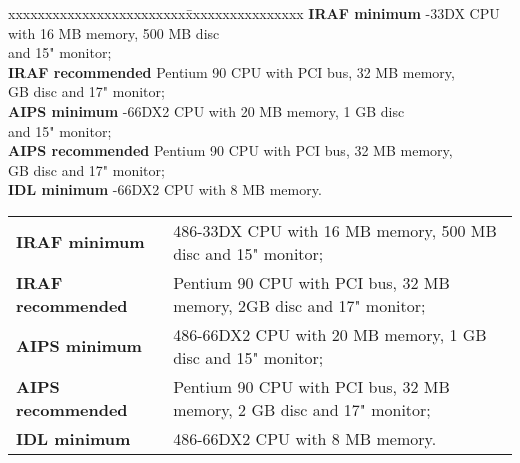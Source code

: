 \documentclass[twoside,11pt]{article}
\newenvironment{latexonly}{}{}
\begin{document}
\begin{latexonly}
\begin{tabbing}
xxxxxxxxxxxxxxxxxxxxxxxx\=xxxxxxxxxxxxxxxx\kill
{\bf IRAF minimum}     -33DX CPU with 16 MB memory, 500 MB disc\\
                       \> and 15" monitor;\\
{\bf IRAF recommended} \> Pentium 90 CPU with PCI bus, 32 MB memory,\\
                        GB disc and 17" monitor;\\
{\bf AIPS minimum}     -66DX2 CPU with 20 MB memory, 1 GB disc\\
                       \> and 15" monitor;\\
{\bf AIPS recommended} \> Pentium 90 CPU with PCI bus, 32 MB memory,\\
                        GB disc and 17" monitor;\\
{\bf IDL minimum}      -66DX2 CPU with 8 MB memory.
\end{tabbing}
\end{latexonly}

\begin{htmlonly}
\begin{tabular}{ll}
{\bf IRAF minimum}     & 486-33DX CPU with 16 MB memory, 500 MB disc and 15" monitor;\\
{\bf IRAF recommended} & Pentium 90 CPU with PCI bus, 32 MB memory, 2GB disc and 17" monitor;\\
{\bf AIPS minimum}     & 486-66DX2 CPU with 20 MB memory, 1 GB disc and 15" monitor;\\
{\bf AIPS recommended} & Pentium 90 CPU with PCI bus, 32 MB memory, 2 GB disc and 17" monitor;\\
{\bf IDL minimum}      & 486-66DX2 CPU with 8 MB memory.
\end{tabular}
\end{htmlonly}
\newpage
 
\end{document}
